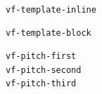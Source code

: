 \documentclass{article}
\begin{document}
\verb|vf-template-inline|
\begin{verbatim}
vf-template-block
\end{verbatim}

\begin{verbatim}
vf-pitch-first
vf-pitch-second
vf-pitch-third
\end{verbatim}
\end{document}
